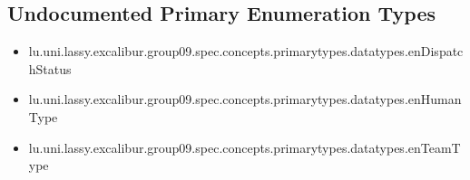 \subsection[Undocumented Primary Enumeration Types]{Undocumented Primary Enumeration Types}
\begin{itemize}
\item lu.uni.lassy.excalibur.group09.spec.concepts.primarytypes.datatypes.enDispatchStatus 
\item lu.uni.lassy.excalibur.group09.spec.concepts.primarytypes.datatypes.enHumanType 
\item lu.uni.lassy.excalibur.group09.spec.concepts.primarytypes.datatypes.enTeamType 
\end{itemize}















